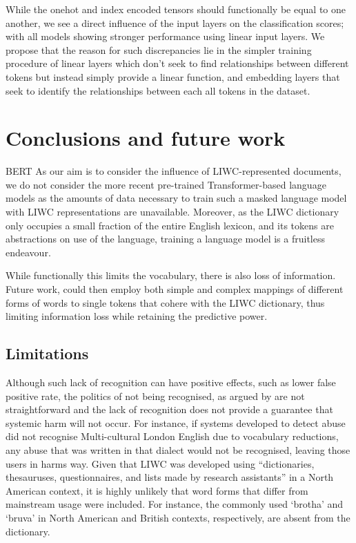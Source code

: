 
While the onehot and index encoded tensors should functionally be equal to one another, we see a direct influence of the input layers on the classification scores; with all models showing stronger performance using linear input layers. We propose that the reason for such discrepancies lie in the simpler training procedure of linear layers which don't seek to find relationships between different tokens but instead simply provide a linear function, and embedding layers that seek to identify the relationships between each all tokens in the dataset.

\section{Conclusions and future work}

BERT \cite{Koufakou,Vidgen,Tran:2020,Isaksen:2020}
As our aim is to consider the influence of LIWC-represented documents, we do not consider the more recent pre-trained Transformer-based language models \citep[e.g.]{Devlin:2019,Liu:2019} as the amounts of data necessary to train such a masked language model with LIWC representations are unavailable. Moreover, as the LIWC dictionary only occupies a small fraction of the entire English lexicon, and its tokens are abstractions on use of the language, training a language model is a fruitless endeavour.

While functionally this limits the vocabulary, there is also loss of information. Future work, could then employ both simple and complex mappings of different forms of words to single tokens that cohere with the LIWC dictionary, thus limiting information loss while retaining the predictive power.

\subsection{Limitations}
Although such lack of recognition can have positive effects, such as lower false positive rate, the politics of not being recognised, as argued by \citet{Benjamin:2019} are not straightforward and the lack of recognition does not provide a guarantee that systemic harm will not occur. For instance, if systems developed to detect abuse did not recognise Multi-cultural London English due to vocabulary reductions, any abuse that was written in that dialect would not be recognised, leaving those users in harms way. Given that LIWC was developed using ``dictionaries, thesauruses, questionnaires, and lists made by research assistants'' \citep{Tauscik:2010} in a North American context, it is highly unlikely that word forms that differ from mainstream usage were included. For instance, the commonly used `brotha' and `bruva' in North American and British contexts, respectively, are absent from the dictionary.
